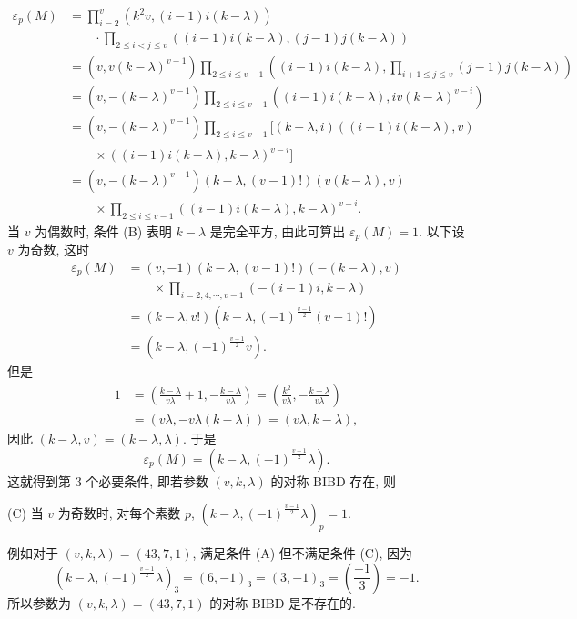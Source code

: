 \[
  \begin{aligned}
    \varepsilon_p(M)&=\prod_{i=2}^{v}(k^2v,(i-1)i(k-\lambda))\\
    &\qquad\cdot\prod_{2\leqslant i<j\leqslant v}((i-1)i(k-\lambda),(j-1)j(k-\lambda))\\
    &=(v,v(k-\lambda)^{v-1})\prod_{2\leqslant i\leqslant v-1}
    ((i-1)i(k-\lambda),\prod_{i+1\leqslant j\leqslant v}(j-1)j(k-\lambda))\\
    &=(v,-(k-\lambda)^{v-1})\prod_{2\leqslant i\leqslant v-1}
    ((i-1)i(k-\lambda),iv(k-\lambda)^{v-i})\\
    &=(v,-(k-\lambda)^{v-1})\prod_{2\leqslant i\leqslant v-1}
    [(k-\lambda,i)((i-1)i(k-\lambda),v)\\
    &\qquad\times((i-1)i(k-\lambda),k-\lambda)^{v-i}]\\
    &=(v,-(k-\lambda)^{v-1})(k-\lambda,(v-1)!)(v(k-\lambda),v)\\
    &\qquad\times\prod_{2\leqslant i\leqslant v-1}((i-1)i(k-\lambda),k-\lambda)^{v-i}.
  \end{aligned}
\]
当 $v$ 为偶数时, 条件 (B) 表明 $k-\lambda$ 是完全平方, 由此可算出 $\varepsilon_p(M)=1$. 以下设 $v$ 为奇数, 这时
\[
  \begin{aligned}
    \varepsilon_p(M)&=(v,-1)(k-\lambda,(v-1)!)(-(k-\lambda),v)\\
    &\qquad\times\prod_{i=2,4,\cdots,v-1}(-(i-1)i,k-\lambda)\\
    &=(k-\lambda,v!)(k-\lambda,(-1)^{\frac{v-1}{2}}(v-1)!)\\
    &=(k-\lambda,(-1)^{\frac{v-1}{2}}v).
  \end{aligned}
\]
但是
\[
  \begin{aligned}
    1&=\left(\frac{k-\lambda}{v\lambda}+1,-\frac{k-\lambda}{v\lambda}\right)
    =\left(\frac{k^2}{v\lambda},-\frac{k-\lambda}{v\lambda}\right)\\
    &=(v\lambda,-v\lambda(k-\lambda))=(v\lambda,k-\lambda),
  \end{aligned}
\]
因此 $(k-\lambda,v)=(k-\lambda,\lambda)$. 于是
\[
  \varepsilon_p(M)=(k-\lambda,(-1)^{\frac{v-1}{2}}\lambda).
\]
这就得到第 $3$ 个必要条件, 即若参数 $(v,k,\lambda)$ 的对称 BIBD 存在, 则

(C) 当 $v$ 为奇数时, 对每个素数 $p$, $(k-\lambda,(-1)^{\frac{v-1}{2}}\lambda)_p=1$.

例如对于 $(v,k,\lambda)=(43,7,1)$, 满足条件 (A) 但不满足条件 (C), 因为
\[
  (k-\lambda,(-1)^{\frac{v-1}{2}}\lambda)_3=(6,-1)_3=(3,-1)_3
  =\left(\frac{-1}{3}\right)=-1.
\]
所以参数为 $(v,k,\lambda)=(43,7,1)$ 的对称 BIBD 是不存在的.

